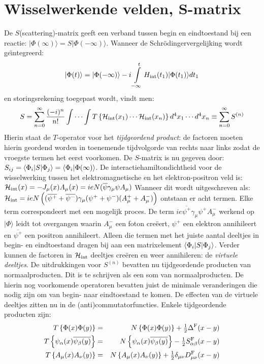 \documentclass[twoside]{report}
\begin{document}
\section[~~Wisselwerkende velden, S-matrix]{Wisselwerkende velden, S-matrix}
De $S$(scattering)-matrix geeft een verband tussen begin en eindtoestand bij
een reactie: $|\Phi(\infty)\rangle=S|\Phi(-\infty)\rangle$. Wanneer de
Schr\"odingervergelijking wordt ge\"{\i}ntegreerd:
\[
|\Phi(t)\rangle=|\Phi(-\infty)\rangle-i\int\limits_{-\infty}^t H_{\rm int}(t_1)|\Phi(t_1)\rangle dt_1
\]
en storingsrekening toegepast wordt, vindt men:
\[
S=\sum_{n=0}^\infty\frac{(-i)^n}{n!}\int\cdots\int
T\left\{{\cal H}_{\rm int}(x_1)\cdots{\cal H}_{\rm int}(x_n)\right\}d^4x_1\cdots d^4x_n
\equiv\sum_{n=0}^\infty S^{(n)}
\]
Hierin staat de $T$-operator voor het {\it tijdgeordend product}: de factoren
moeten hierin geordend worden in toenemende tijdvolgorde van rechts naar links
zodat de vroegste termen het eerst voorkomen. De $S$-matrix is nu gegeven door:
$S_{ij}=\left\langle \Phi_i|S|\Phi_j \right\rangle=\left\langle \Phi_i|\Phi(\infty) \right\rangle$.
\npar
De interactiehamiltondichtheid voor de wisselwerking tussen het
elektromagnetische en het elektron-positron veld is:
${\cal H}_{\rm int}(x)=-J_\mu(x)A_\mu(x)=ieN(\overline{\psi}\gamma_\mu\psi A_\mu)$
\npar
Wanneer dit wordt uitgeschreven als:
${\cal H}_{\rm int}=ieN\left((\overline{\psi^+}+\overline{\psi^-})\gamma_\mu(\psi^++\psi^-)(A_\mu^++A_\mu^-)\right)$
\npar
ontstaan er acht termen. Elke term correspondeert met een mogelijk proces. De
term $ie\overline{\psi^+}\gamma_\mu\psi^+A_\mu^-$ werkend op $|\Phi\rangle$
leidt tot overgangen waarin $A_\mu^-$ een foton cre\"eert, $\psi^+$ een
elektron annihileert en $\overline{\psi^+}$ een positron annihileert.
Alleen die termen met het juiste aantal deeltjes in begin- en eindtoestand
dragen bij aan een matrixelement $\left\langle \Phi_i|S|\Phi_j \right\rangle$. Verder kunnen de
factoren in ${\cal H}_{\rm int}$ deeltjes cre\"eren en weer annihileren:
de {\it virtuele deeltjes}.
\npar
De uitdrukkingen voor $S^{(n)}$ bevatten nu tijdgeordende producten van
normaalproducten. Dit is te schrijven als een som van normaalproducten.
De hierin nog voorkomende operatoren bevatten juist de minimale veranderingen
die nodig zijn om van begin- naar eindtoestand te komen. De effecten van de
virtuele deeltjes zitten nu in de (anti)commutatorfuncties. Enkele
tijdgeordende producten zijn:
\begin{eqnarray*}
T\left\{\Phi(x)\Phi(y)\right\}&=&N\left\{\Phi(x)\Phi(y)\right\}+\mbox{$\frac{1}{2}$}\Delta^{\rm F}(x-y)\\
T\left\{\psi_\alpha(x)\overline{\psi_\beta(y)}\right\}&=&N\left\{\psi_\alpha(x)\overline{\psi_\beta(y)}\right\}-\mbox{$\frac{1}{2}$} S_{\alpha\beta}^{\rm F}(x-y)\\
T\left\{A_\mu(x)A_\nu(y)\right\}&=&N\left\{A_\mu(x)A_\nu(y)\right\}+\mbox{$\frac{1}{2}$}\delta_{\mu\nu}D_{\mu\nu}^{\rm F}(x-y)
\end{eqnarray*}
\end{document}
